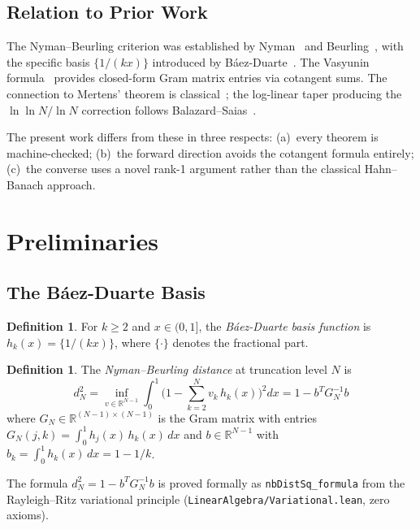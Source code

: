 \documentclass[11pt,a4paper]{article}
\theoremstyle{plain}
\theoremstyle{definition}
\newtheorem{definition}[theorem]{Definition}
\theoremstyle{remark}
\newcommand{\RR}{\mathbb{R}}
\newcommand{\fract}[1]{\{#1\}}
\newcommand{\lean}[1]{\texttt{#1}}
\begin{document}
\subsection{Relation to Prior Work}

The Nyman--Beurling criterion was established by Nyman~\cite{nyman1950}
and Beurling~\cite{beurling1955}, with the specific basis $\fract{1/(kx)}$
introduced by B\'aez-Duarte~\cite{baezduarte2003}. The Vasyunin
formula~\cite{vasyunin1995} provides closed-form Gram matrix entries
via cotangent sums. The connection to Mertens' theorem is
classical~\cite{mertens1897}; the log-linear taper producing the
$\ln\ln N / \ln N$ correction follows Balazard--Saias~\cite{balazard2000}.

The present work differs from these in three respects: (a)~every theorem
is machine-checked; (b)~the forward direction avoids the cotangent
formula entirely; (c)~the converse uses a novel rank-1 argument rather
than the classical Hahn--Banach approach.

\section{Preliminaries}
\label{sec:prelim}

\subsection{The B\'aez-Duarte Basis}

\begin{definition}
For $k \geq 2$ and $x \in (0,1]$, the \emph{B\'aez-Duarte basis function}
is $h_k(x) = \fract{1/(kx)}$, where $\fract{\cdot}$ denotes the
fractional part.
\end{definition}

\begin{definition}
The \emph{Nyman--Beurling distance} at truncation level $N$ is
\[
  d_N^2 = \inf_{v \in \RR^{N-1}} \int_0^1
    \biggl(1 - \sum_{k=2}^{N} v_k\,h_k(x)\biggr)^2 dx
  = 1 - b^T G_N^{-1} b
\]
where $G_N \in \RR^{(N-1) \times (N-1)}$ is the Gram matrix with entries
$G_N(j,k) = \int_0^1 h_j(x)\,h_k(x)\,dx$ and
$b \in \RR^{N-1}$ with $b_k = \int_0^1 h_k(x)\,dx = 1 - 1/k$.
\end{definition}

The formula $d_N^2 = 1 - b^T G_N^{-1} b$ is proved formally
as \lean{nbDistSq\_formula} from the Rayleigh--Ritz variational
principle (\lean{LinearAlgebra/Variational.lean}, zero axioms).
\end{document}
